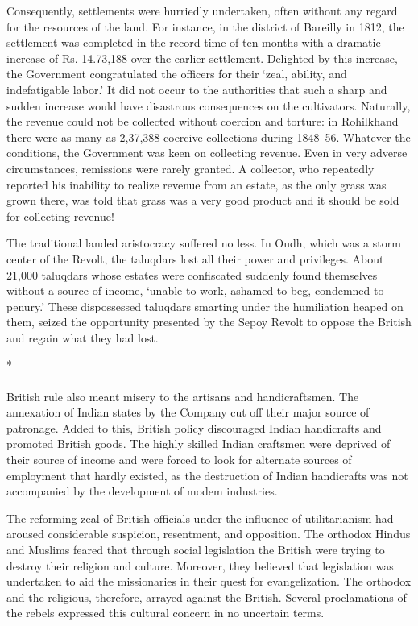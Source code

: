 Consequently, settlements were hurriedly undertaken, often without any regard for the resources of the land. For instance, in the district of Bareilly in 1812, the settlement was completed in the record time of ten months with a dramatic increase of Rs. 14.73,188 over the earlier settlement. Delighted by this increase, the Government congratulated the officers for their `zeal, ability, and indefatigable labor.' It did not occur to the authorities that such a sharp and sudden increase would have disastrous consequences on the cultivators. Naturally, the revenue could not be collected without coercion and torture: in Rohilkhand there were as many as 2,37,388 coercive collections during 1848--56. Whatever the conditions, the Government was keen on collecting revenue. Even in very adverse circumstances, remissions were rarely granted. A collector, who repeatedly reported his inability to realize revenue from an estate, as the only grass was grown there, was told that grass was a very good product and it should be sold for collecting revenue!

The traditional landed aristocracy suffered no less. In Oudh, which was a storm center of the Revolt, the taluqdars lost all their power and privileges. About 21,000 taluqdars whose estates were confiscated suddenly found themselves without a source of income, `unable to work, ashamed to beg, condemned to penury.' These dispossessed taluqdars smarting under the humiliation heaped on them, seized the opportunity presented by the Sepoy Revolt to oppose the British and regain what they had lost.

\begin{center}*\end{center}

\paragraph*{}
British rule also meant misery to the artisans and handicraftsmen. The annexation of Indian states by the Company cut off their major source of patronage. Added to this, British policy discouraged Indian handicrafts and promoted British goods. The highly skilled Indian craftsmen were deprived of their source of income and were forced to look for alternate sources of employment that hardly existed, as the destruction of Indian handicrafts was not accompanied by the development of modem industries.

The reforming zeal of British officials under the influence of utilitarianism had aroused considerable suspicion, resentment, and opposition. The orthodox Hindus and Muslims feared that through social legislation the British were trying to destroy their religion and culture. Moreover, they believed that legislation was undertaken to aid the missionaries in their quest for evangelization. The orthodox and the religious, therefore, arrayed against the British. Several proclamations of the rebels expressed this cultural concern in no uncertain terms.

